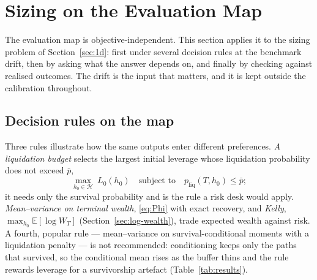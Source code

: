 \documentclass[11pt]{article}
\newcommand{\E}{\mathbb{E}}
\theoremstyle{plain}
\theoremstyle{definition}
\theoremstyle{remark}
\begin{document}
\section{Sizing on the Evaluation Map}\label{sec:sizing}

The evaluation map is objective-independent. This section applies it to the sizing problem of
Section~\ref{sec:1d}: first under several decision rules at the benchmark drift, then by asking
what the answer depends on, and finally by checking against realised outcomes. The drift is the
input that matters, and it is kept outside the calibration throughout.

\subsection{Decision rules on the map}\label{sec:rules}
Three rules illustrate how the same outputs enter different preferences.
\emph{A liquidation budget} selects the largest initial leverage whose liquidation probability does
not exceed $\bar p$,
\begin{equation}\label{eq:rule-constrained}
\max_{h_0\in\mathcal H}\ L_0(h_0)\quad\text{subject to}\quad p_{\mathrm{liq}}(T,h_0)\le\bar p ;
\end{equation}
it needs only the survival probability and is the rule a risk desk would apply.
\emph{Mean--variance on terminal wealth}, \eqref{eq:Phi} with exact recovery, and \emph{Kelly},
$\max_{h_0}\E[\log W_T]$ (Section~\ref{sec:log-wealth}), trade expected wealth against risk.
A fourth, popular rule --- mean--variance on survival-conditional moments with a liquidation
penalty --- is not recommended: conditioning keeps only the paths that survived, so the
conditional mean rises as the buffer thins and the rule rewards leverage for a survivorship
artefact (Table~\ref{tab:results}).
\end{document}
